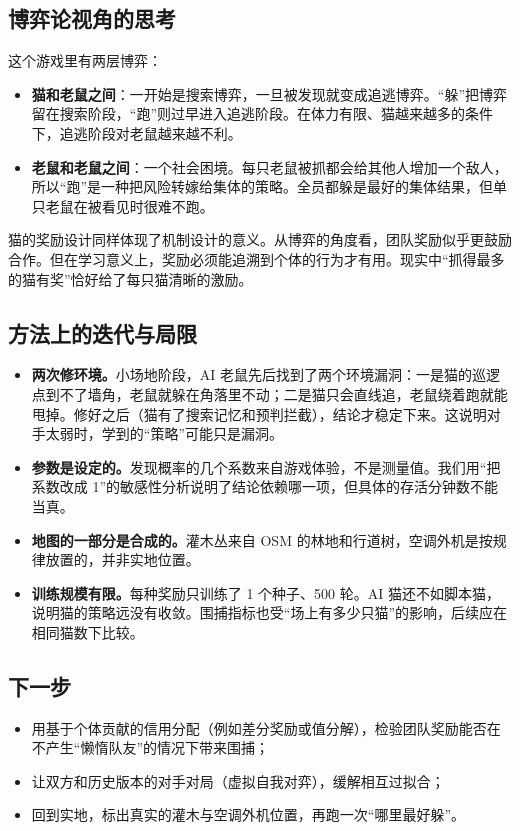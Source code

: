 \documentclass[a4paper,zihao=5,fontset=fandol,UTF8]{ctexart}
\begin{document}
\subsection{博弈论视角的思考}
这个游戏里有两层博弈：
\begin{itemize}
  \item \textbf{猫和老鼠之间}：一开始是搜索博弈，一旦被发现就变成追逃博弈。“躲”把博弈留在搜索阶段，“跑”则过早进入追逃阶段。在体力有限、猫越来越多的条件下，追逃阶段对老鼠越来越不利。
  \item \textbf{老鼠和老鼠之间}：一个社会困境。每只老鼠被抓都会给其他人增加一个敌人，所以“跑”是一种把风险转嫁给集体的策略。全员都躲是最好的集体结果，但单只老鼠在被看见时很难不跑。
\end{itemize}

猫的奖励设计同样体现了机制设计的意义。从博弈的角度看，团队奖励似乎更鼓励合作。但在学习意义上，奖励必须能追溯到个体的行为才有用。现实中“抓得最多的猫有奖”恰好给了每只猫清晰的激励。

\subsection{方法上的迭代与局限}
\begin{itemize}
  \item \textbf{两次修环境。}小场地阶段，AI 老鼠先后找到了两个环境漏洞：一是猫的巡逻点到不了墙角，老鼠就躲在角落里不动；二是猫只会直线追，老鼠绕着跑就能甩掉。修好之后（猫有了搜索记忆和预判拦截），结论才稳定下来。这说明对手太弱时，学到的“策略”可能只是漏洞。
  \item \textbf{参数是设定的。}发现概率的几个系数来自游戏体验，不是测量值。我们用“把系数改成 1”的敏感性分析说明了结论依赖哪一项，但具体的存活分钟数不能当真。
  \item \textbf{地图的一部分是合成的。}灌木丛来自 OSM 的林地和行道树，空调外机是按规律放置的，并非实地位置。
  \item \textbf{训练规模有限。}每种奖励只训练了 1 个种子、500 轮。AI 猫还不如脚本猫，说明猫的策略远没有收敛。围捕指标也受“场上有多少只猫”的影响，后续应在相同猫数下比较。
\end{itemize}

\subsection{下一步}
\begin{itemize}
  \item 用基于个体贡献的信用分配（例如差分奖励或值分解），检验团队奖励能否在不产生“懒惰队友”的情况下带来围捕；
  \item 让双方和历史版本的对手对局（虚拟自我对弈），缓解相互过拟合；
  \item 回到实地，标出真实的灌木与空调外机位置，再跑一次“哪里最好躲”。
\end{itemize}
\end{document}
